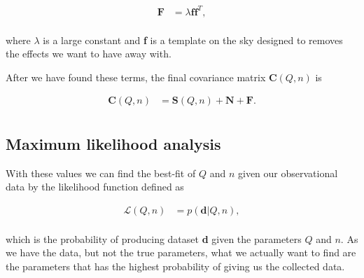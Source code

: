 \documentclass{emulateapj}
\begin{document}

\begin{equation}
\label{F_cov}
\begin{array}{rl}
\textbf{F} &= \lambda \textbf{ff}^T,   \\ 
\end{array}
\end{equation}
 
\noindent
where $\lambda$ is a large constant and \textbf{f} is a template on the sky designed to removes the effects we want to have away with.
 
  
After we have found these terms, the final covariance matrix $\textbf{C}(Q, n)$ is
 
\begin{equation}
\label{C_cov}
   \begin{array}{rl}
    \textbf{C}(Q, n) &= \textbf{S}(Q, n) + \textbf{N} + \textbf{F}.  \\ 
 \end{array}
\end{equation}



\subsection{Maximum likelihood analysis} 
 
With these values we can find the best-fit of $Q$ and $n$ given our observational data by the likelihood function defined as 

\begin{equation}
\label{likelihood}
\begin{array}{rl}
\mathcal{L}(Q,n) &= p(\textbf{d}|Q,n),  \\ 
\end{array}
\end{equation}

\noindent
which is the probability of producing dataset \textbf{d} given the parameters $Q$ and $n$. 
As we have the data, but not the true parameters, what we actually want to find are the parameters that has the highest probability of giving us the collected data.  
\end{document}
